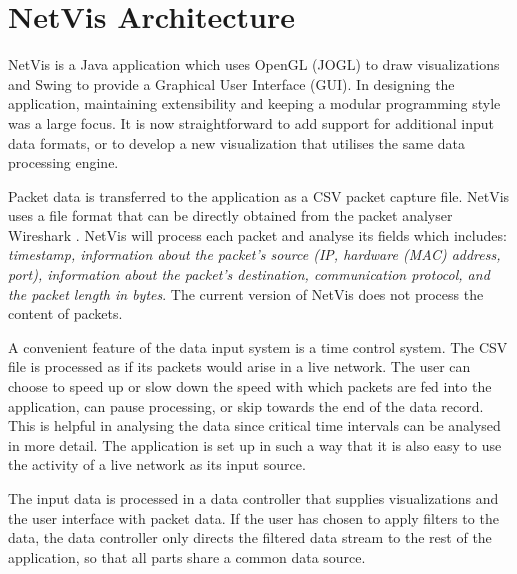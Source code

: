 \section{NetVis Architecture}\label{sec:overview}
NetVis is a Java application which uses OpenGL (JOGL) to draw visualizations and Swing to provide a
Graphical User Interface (GUI). In designing the application, maintaining extensibility and keeping
a modular programming style was a large focus. It is now straightforward to add support for
additional input data formats, or to develop a new visualization that utilises the same data
processing engine.

Packet data is transferred to the application as a CSV packet capture file. NetVis uses a file
format that can be directly obtained from the packet analyser Wireshark \cite{wireshark}. NetVis
will process each packet and analyse its fields which includes: \textit{timestamp, information about the packet's source (IP, hardware (MAC) address, port), information about the packet's destination,
communication protocol, and the packet length in bytes}. The current version of NetVis does not
process the content of packets. 


A convenient feature of the data input system is a time control system. The CSV file is processed as
if its packets would arise in a live network. The user can choose to speed up or slow down the
speed with which packets are fed into the application, can pause processing, or skip towards the end
of the data record. This is helpful in analysing the data since critical time intervals can be
analysed in more detail. The application is set up in such a way that it is also easy to use the
activity of a live network as its input source. 

The input data is processed in a data controller that supplies visualizations and the user
interface with packet data. If the user has chosen to apply filters to the data, the data controller
only directs the filtered data stream to the rest of the application, so that all parts share a
common data source.

